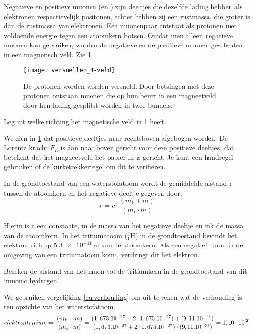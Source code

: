\begin{questions}
Negatieve en positieve muonen (\Pmuon en \APmuon) zijn deeltjes die 
dezelfde lading hebben als elektronen respectievelijk positonen, echter hebben 
zij een rustmassa, die groter is dan de rustmassa van elektronen.
Een muonenpaar ontstaat als protonen met voldoende energie tegen een atoomkern 
botsen. Omdat men alleen negatieve muonen kan gebruiken, worden de negatieve 
en de positieve muonen gescheiden in een magnetisch veld. Zie \ref{fig:versnellen_B-veld}.

\begin{figure}
    \centering
    \texttt{[image: versnellen\_B-veld]}
    \caption{De protonen worden worden versneld. Door botsingen met deze protonen 
    ontstaan muonen die op hun beurt in een magneetveld door hun lading gesplitst 
    worden in twee bundels.}
    \label{fig:versnellen_B-veld}
\end{figure}


\question
 Leg uit welke richting het magnetische veld in \ref{fig:versnellen_B-veld} heeft.
\begin{solution} 
 We zien in \ref{fig:versnellen_B-veld} dat positieve deeltjes naar rechtsboven 
 afgebogen worden. De Lorentz kracht $F_{L}$ is dan naar boven gericht 
 voor deze positieve deeltjes, dat betekent dat het magneetveld het papier in is gericht.
 Je kunt een handregel gebruiken of de kurketrekkerregel om dit te verifiëren.
\end{solution} 



 In de grondtoestand van een waterstofatoom wordt de gemiddelde afstand r 
 tussen de atoomkern en het negatieve deeltje gegeven door: 
\begin{equation}
\label{eq:verhouding}
    r = c \cdot \frac{ (m_k + m)}{(m_k \cdot m)}
\end{equation}

Hierin is c een constante, m de massa van het negatieve deeltje en mk de 
massa van de atoomkern. In het tritiumatoom ($^3_1\mathrm{H}$) in de grondtoestand bevindt 
het elektron zich op $\SI{5,3e-11}{\meter}$ van de atoomkern.
Als een negatief muon in de omgeving van een tritiumatoom komt, verdringt 
dit het elektron.

\question
Bereken de afstand van het muon tot de tritiumkern in de grondtoestand van dit `muonic hydrogen'.
\begin{solution} 
We gebruiken vergelijking \ref{eq:verhouding} om uit te reken wat de verhouding is
ten opzichte van het waterstofatoom.
\begin{equation}
elektrontritium \Rightarrow 
\frac{ (m_k + m)}{(m_k \cdot m)} = \frac{(1,673.10^{-27} + 
        2 \cdot 1,675.10^{-27})+(9,11.10^{-31})}{(1,673.10^{-27} + 
        2 \cdot 1,675.10^{-27})\cdot (9,11.10^{-31})} = 1,10 \cdot 10^{30}\\
\end{equation}
\end{solution} 



\end{questions}
